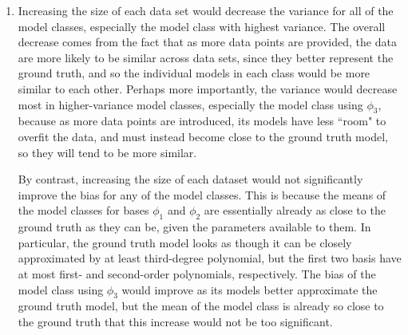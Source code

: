 \documentclass[submit]{harvardml}
\begin{document}
\begin{enumerate}
	\item Increasing the size of each data set would decrease the variance for all of the model classes, especially the model class with highest variance. The overall decrease comes from the fact that as more data points are provided, the data are more likely to be similar across data sets, since they better represent the ground truth, and so the individual models in each class would be more similar to each other. Perhaps more importantly, the variance would decrease most in higher-variance model classes, especially the model class using $\phi_3$, because as more data points are introduced, its models have less ``room" to overfit the data, and must instead become close to the ground truth model, so they will tend to be more similar.
	
	By contrast, increasing the size of each dataset would not significantly improve the bias for any of the model classes. This is because the means of the model classes for bases $\phi_1$ and $\phi_2$ are essentially already as close to the ground truth as they can be, given the parameters available to them. In particular, the ground truth model looks as though it can be closely approximated by at least third-degree polynomial, but the first two basis have at most first- and second-order polynomials, respectively. The bias of the model class using $\phi_3$ would improve as its models better approximate the ground truth model, but the mean of the model class is already so close to the ground truth that this increase would not be too significant.

\end{enumerate}

\end{document}
